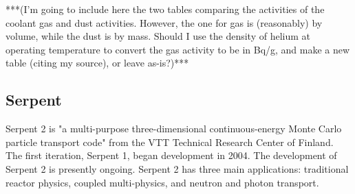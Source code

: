 ***(I'm going to include here the two tables comparing the activities of the coolant gas and dust activities.  However, the one for gas is (reasonably) by volume, while the dust is by mass.  Should I use the density of helium at operating temperature to convert the gas activity to be in Bq/g, and make a new table (citing my source), or leave as-is?)***





\subsection{Serpent}
Serpent 2 is "a multi-purpose three-dimensional continuous-energy Monte Carlo particle transport code" \cite{noauthor_serpent_nodate} from the VTT Technical Research Center of Finland.  The first iteration, Serpent 1, began development in 2004.  The development of Serpent 2 is presently ongoing.  Serpent 2 has three main applications: traditional reactor physics, coupled multi-physics, and neutron and photon transport.  
